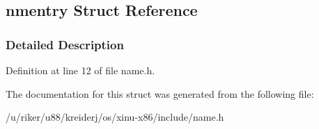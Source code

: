\hypertarget{structnmentry}{}\subsection{nmentry Struct Reference}
\label{structnmentry}


\subsubsection{Detailed Description}


Definition at line 12 of file name.\+h.



The documentation for this struct was generated from the following file\+:\begin{DoxyCompactItemize}
\item 
/u/riker/u88/kreiderj/os/xinu-\/x86/include/name.\+h\end{DoxyCompactItemize}
